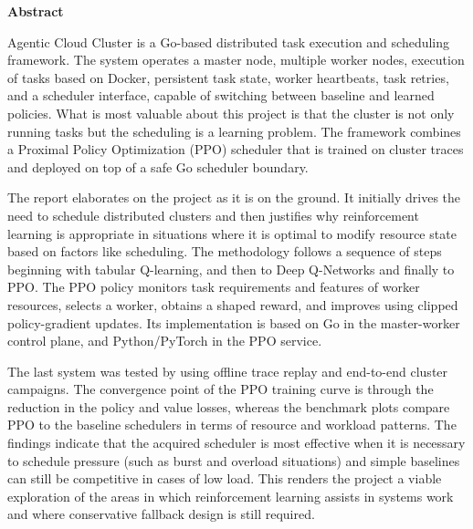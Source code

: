 \thispagestyle{plain}
\begin{center}
{\fontsize{14}{16}\selectfont \textbf{Abstract}}

\vspace{1cm}

\justifying
Agentic Cloud Cluster is a Go-based distributed task execution and scheduling framework. The system operates a master node, multiple worker nodes, execution of tasks based on Docker, persistent task state, worker heartbeats, task retries, and a scheduler interface, capable of switching between baseline and learned policies. What is most valuable about this project is that the cluster is not only running tasks but the scheduling is a learning problem. The framework combines a Proximal Policy Optimization (PPO) scheduler that is trained on cluster traces and deployed on top of a safe Go scheduler boundary.

The report elaborates on the project as it is on the ground. It initially drives the need to schedule distributed clusters and then justifies why reinforcement learning is appropriate in situations where it is optimal to modify resource state based on factors like scheduling. The methodology follows a sequence of steps beginning with tabular Q-learning, and then to Deep Q-Networks and finally to PPO. The PPO policy monitors task requirements and features of worker resources, selects a worker, obtains a shaped reward, and improves using clipped policy-gradient updates. Its implementation is based on Go in the master-worker control plane, and Python/PyTorch in the PPO service.

The last system was tested by using offline trace replay and end-to-end cluster campaigns. The convergence point of the PPO training curve is through the reduction in the policy and value losses, whereas the benchmark plots compare PPO to the baseline schedulers in terms of resource and workload patterns. The findings indicate that the acquired scheduler is most effective when it is necessary to schedule pressure (such as burst and overload situations) and simple baselines can still be competitive in cases of low load. This renders the project a viable exploration of the areas in which reinforcement learning assists in systems work and where conservative fallback design is still required.
\end{center}